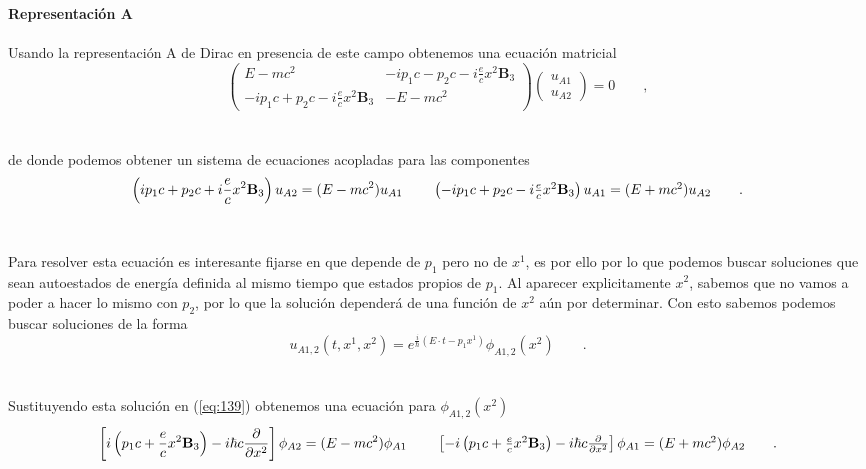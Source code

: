 \documentclass[11pt,letterpaper]{article}     %
\begin{document}
\textbf{Representación A} \\ \\
Usando la representación A de Dirac en presencia de este campo obtenemos una ecuación matricial
\begin{equation}\label{eq:138}
\begin{pmatrix}
E-mc^2 & -i p_1c-p_2c - i\frac{e}{c}x^2 \textbf{B}_3 \\  -i p_1 c+p_2c - i\frac{e}{c}x^2 \textbf{B}_3 & -E-mc^2
\end{pmatrix}
\begin{pmatrix}
u_{A1} \\ u_{A2}
\end{pmatrix} = 0 \qquad ,
\end{equation} \\ \\
de donde podemos obtener un sistema de ecuaciones acopladas para las componentes
\begin{equation}\label{eq:139}
\left( i p_1c+p_2c +i \frac{e}{c}x^2 \textbf{B}_3 \right)u_{A2}=(E-mc^2)u_{A1} \qquad  \;{} $$\\$$
\left(-i p_1c+p_2c -i \frac{e}{c}x^2 \textbf{B}_3 \right)u_{A1}=(E+mc^2)u_{A2} \qquad .
\end{equation} \\ \\
Para resolver esta ecuación es interesante fijarse en que depende de $p_1$ pero no de $x^1$, es por ello por lo que podemos buscar soluciones que sean autoestados de energía definida al mismo tiempo que estados propios de $p_1$. Al aparecer explicitamente $x^2$, sabemos que no vamos a poder a hacer lo mismo con $p_2$, por lo que la solución dependerá de una función de $x^2$ aún por determinar. Con esto sabemos podemos buscar soluciones de la forma
\begin{equation}\label{eq:140}
u_{A1,2}(t,x^1,x^2)=e^{\frac{i}{\hbar}(E\cdot t - p_{1}x^{1})} \phi_{A1,2}(x^2) \qquad .
\end{equation} \\ \\
Sustituyendo esta solución en (\ref{eq:139}) obtenemos una ecuación para $\phi_{A1,2}(x^2)$
\begin{equation}\label{eq:141}
\left[ i \left(p_1c +\frac{e}{c}x^2 \textbf{B}_3 \right) -i \hbar c\frac{\partial}{\partial x^2}\right]\phi_{A2}=(E-mc^2)\phi_{A1} \qquad  \;{} $$\\$$
\left[ -i \left(p_1c +\frac{e}{c}x^2 \textbf{B}_3 \right) -i \hbar c\frac{\partial}{\partial x^2}\right]\phi_{A1}=(E+mc^2)\phi_{A2}\qquad .
\end{equation} \\ \\
\end{document}
